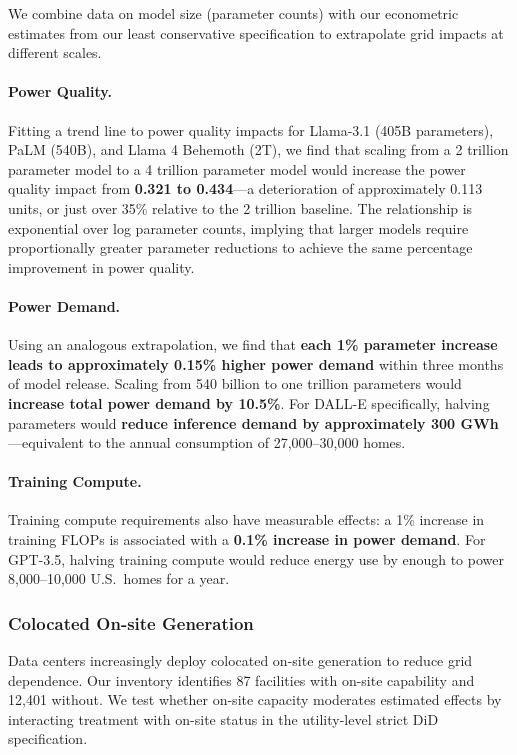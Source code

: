 \documentclass[sigconf]{acmart}
\begin{document}
We combine data on model size (parameter counts) with our econometric estimates from our least conservative specification to extrapolate grid impacts at different scales.

\paragraph{Power Quality.} Fitting a trend line to power quality impacts for Llama-3.1 (405B parameters), PaLM (540B), and Llama 4 Behemoth (2T), we find that scaling from a 2 trillion parameter model to a 4 trillion parameter model would increase the power quality impact from \textbf{0.321 to 0.434}---a deterioration of approximately 0.113 units, or just over 35\% relative to the 2 trillion baseline. The relationship is exponential over log parameter counts, implying that larger models require proportionally greater parameter reductions to achieve the same percentage improvement in power quality.

\paragraph{Power Demand.} Using an analogous extrapolation, we find that \textbf{each 1\% parameter increase leads to approximately 0.15\% higher power demand} within three months of model release. Scaling from 540 billion to one trillion parameters would \textbf{increase total power demand by 10.5\%}. For DALL-E specifically, halving parameters would \textbf{reduce inference demand by approximately 300 GWh}---equivalent to the annual consumption of 27,000--30,000 homes.

\paragraph{Training Compute.} Training compute requirements also have measurable effects: a 1\% increase in training FLOPs is associated with a \textbf{0.1\% increase in power demand}. For GPT-3.5, halving training compute would reduce energy use by enough to power 8,000--10,000 U.S.\ homes for a year.

\subsubsection{Colocated On-site Generation}

Data centers increasingly deploy colocated on-site generation to reduce grid dependence. Our inventory identifies 87 facilities with on-site capability and 12,401 without. We test whether on-site capacity moderates estimated effects by interacting treatment with on-site status in the utility-level strict DiD specification.
\end{document}
